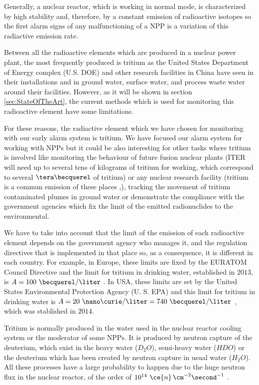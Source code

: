 Generally, a nuclear reactor, which is working in normal mode, is characterized by high stability and, therefore, by a constant emission of radioactive isotopes so the first alarm signs of any malfunctioning of a NPP is a variation of this radiactive emission rate.

Between all the radioactive elements which are produced in a nuclear power plant, the most frequently produced is tritium as the United States Department of Energy complex (U.S. DOE) \cite{FiberDetector1a} \cite{FiberDetector1b}  and other research facilities in China \cite{CommonEmissionTritium} have seen in their installations and in ground water, surface water, and process waste water around their facilities. However, as it will be shown in section \ref{sec:StateOfTheArt}, the current methods which is used for monitoring this radioactive element have some limitations. 

For these reasons, the radiactive element which we have chosen for monitoring with our early alarm system is tritium. We have focused our alarm system for working with NPPs but it could be also interesting for other tasks where tritium is involved like monitoring the behaviour of future fusion nuclear plants (ITER will need up to several tens of kilograms of tritium for working, which correspond to several $\tera\becquerel$ of tritium) or any nuclear research facility (tritium is a commun emission of these places \cite{FERMILAB},\cite{BrookHavenNationalLaboratory}),  tracking the movement of tritium contaminated plumes in ground water \cite{TrackingTritium} or demonstrate the compliance with the government agencies which fix the limit of the emitted radionuclides to the environmental. 

We have to take into account that the limit of the emission of each radioactive element depends on the government agency who manages it, and the regulation directives that is implemented in that place so, as a consequence, it is different in each country. For example, in Europe, these limits are fixed by the EURATOM Council Directive and the limit for tritium in drinking water, established in $2013$, is $A = 100~\becquerel/\liter$ \cite{100BqL}. In USA, these limits are set by the United States Environmental Protection Agency (U. S. EPA) and this limit for tritium in drinking water is $A = 20~\nano\curie/\liter = 740~\becquerel/\liter$ \cite{740BqL}, which was stablished in $2014$.

Tritium is normally produced in the water used in the nuclear reactor cooling system or the moderator of some NPPs. It is produced by neutron capture of the deuterium, which exist in the heavy water ($D_2 O$), semi-heavy water ($H D O$) or the deuterium which has been created by neutron capture in usual water ($H_2 O$). All these processes have a large probability to happen due to the huge neutron flux in the nuclear reactor, of the order of $10^{14} ~\ce{n} \, \cm^{-2} \second^{-1}$ \cite{CrossSeccionNeutrons}. 


